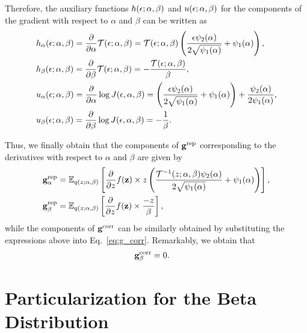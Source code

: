 \documentclass{article}
\begin{document}
Therefore, the auxiliary functions $h(\epsilon;\alpha,\beta)$ and $u(\epsilon;\alpha,\beta)$ for the components of the gradient with respect to $\alpha$ and $\beta$ can be written as
\begin{align}
    & h_{\alpha}(\epsilon;\alpha,\beta) = \frac{\partial}{\partial\alpha}\mathcal{T}(\epsilon;\alpha,\beta) = \mathcal{T}(\epsilon;\alpha,\beta) \left( \frac{\epsilon\psi_2(\alpha)}{2\sqrt{\psi_1(\alpha)}}+\psi_1(\alpha)\right),\\
    & h_{\beta}(\epsilon;\alpha,\beta) = \frac{\partial}{\partial\beta}\mathcal{T}(\epsilon;\alpha,\beta) = -\frac{\mathcal{T}(\epsilon;\alpha,\beta)}{\beta},\\
    & u_{\alpha}(\epsilon;\alpha,\beta) = \frac{\partial}{\partial\alpha}\log J(\epsilon,\alpha,\beta) = \left( \frac{\epsilon\psi_2(\alpha)}{2\sqrt{\psi_1(\alpha)}}+\psi_1(\alpha)\right)+\frac{\psi_2(\alpha)}{2\psi_1(\alpha)},\\
    & u_{\beta}(\epsilon;\alpha,\beta) = \frac{\partial}{\partial\beta}\log J(\epsilon,\alpha,\beta) = -\frac{1}{\beta}.
\end{align}

Thus, we finally obtain that the components of $\mathbf{g}^{\textrm{rep}}$ corresponding to the derivatives with respect to $\alpha$ and $\beta$ are given by
\begin{align}
    & \mathbf{g}^{\textrm{rep}}_{\alpha} = \mathbb{E}_{q(z;\alpha,\beta)}\left[\frac{\partial}{\partial z}f(\mathbf{z}) \times z \left( \frac{\mathcal{T}^{-1}(z;\alpha,\beta)\psi_2(\alpha)}{2\sqrt{\psi_1(\alpha)}}+\psi_1(\alpha)\right)\right],\\
    & \mathbf{g}^{\textrm{rep}}_{\beta} = \mathbb{E}_{q(z;\alpha,\beta)}\left[\frac{\partial}{\partial z}f(\mathbf{z}) \times \frac{-z}{\beta}\right],
\end{align}
while the components of $\mathbf{g}^{\textrm{corr}}$ can be similarly obtained by substituting the expressions above into Eq.~\ref{eq:g_corr}. Remarkably, we obtain that 
\begin{align}
    & \mathbf{g}^{\textrm{corr}}_{\beta} = 0.
\end{align}

\section{Particularization for the Beta Distribution}
\end{document}
